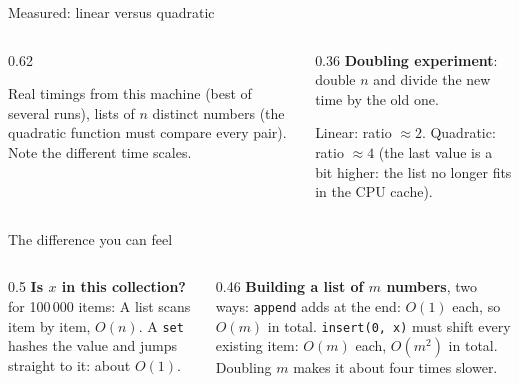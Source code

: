 \documentclass[aspectratio=169,10pt]{beamer}
\newcommand{\pyouts}[2]{}
\begin{document}
\begin{frame}{Measured: linear versus quadratic}
\begin{columns}[T]
\begin{column}{0.62\textwidth}
\begin{sfig}[0.62]
\end{sfig}
{\scriptsize Real timings from this machine (best of several runs), lists of $n$ distinct numbers (the quadratic function must compare every pair). Note the different time scales.}
\end{column}
\begin{column}{0.36\textwidth}
{\small
\textbf{Doubling experiment}: double $n$ and divide the new time by the old one.}
\pyouts{\fontsize{7.4}{8.8}}{doubling}
\vspace{1mm}
{\small
Linear: ratio $\approx 2$. Quadratic: ratio $\approx 4$ (the last value is a bit higher: the list no longer fits in the CPU cache).}
\end{column}
\end{columns}
\end{frame}

\begin{frame}{The difference you can feel}
\begin{columns}[T]
\begin{column}{0.5\textwidth}
{\footnotesize\textbf{Is $x$ in this collection?} for 100\,000 items:}
\vspace{2mm}
{\small A list scans item by item, $O(n)$. A \texttt{set} hashes the value and jumps straight to it: about $O(1)$.}
\end{column}
\begin{column}{0.46\textwidth}
{\footnotesize\textbf{Building a list of $m$ numbers}, two ways:}
\vspace{2mm}
{\small \texttt{append} adds at the end: $O(1)$ each, so $O(m)$ in total. \texttt{insert(0, x)} must shift every existing item: $O(m)$ each, $O(m^2)$ in total. Doubling $m$ makes it about four times slower.}
\end{column}
\end{columns}
\end{frame}
\end{document}

